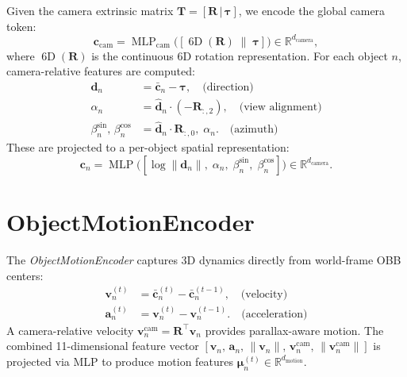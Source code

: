 \documentclass{article}
\newcommand{\mR}{\mathbb{R}}
\newcommand{\op}[1]{\operatorname{#1}}
\newcommand{\mat}[1]{\bm{#1}}
\begin{document}
Given the camera extrinsic matrix $\mat{T} = [\mat{R}\,|\,\boldsymbol{\tau}]$, we encode the global camera token:
\begin{equation}
    \mat{c}_{\text{cam}} = \op{MLP}_{\text{cam}}\bigl([\op{6D}(\mat{R}) \;\|\; \boldsymbol{\tau}]\bigr) \in \mR^{d_{\text{camera}}},
    \label{eq:cam_global}
\end{equation}
where $\op{6D}(\mat{R})$ is the continuous 6D rotation representation. For each object $n$, camera-relative features are computed:
\begin{align}
    \mat{d}_n &= \bar{\mat{c}}_n - \boldsymbol{\tau}, \quad \text{(direction)} \label{eq:cam_dir} \\
    \alpha_n &= \hat{\mat{d}}_n \cdot (-\mat{R}_{:,2}), \quad \text{(view alignment)} \label{eq:view_align} \\
    \beta_n^{\sin},\,\beta_n^{\cos} &= \hat{\mat{d}}_n \cdot \mat{R}_{:,0},\; \alpha_n. \quad \text{(azimuth)} \label{eq:azimuth}
\end{align}
These are projected to a per-object spatial representation:
\begin{equation}
    \mat{c}_n = \op{MLP}\bigl([\log\|\mat{d}_n\|,\;\alpha_n,\;\beta_n^{\sin},\;\beta_n^{\cos}]\bigr) \in \mR^{d_{\text{camera}}}.
    \label{eq:cam_per_obj}
\end{equation}

\section{ObjectMotionEncoder}
\label{sec:ome}

The \emph{ObjectMotionEncoder} captures 3D dynamics directly from world-frame OBB centers:
\begin{align}
    \mat{v}_n^{(t)} &= \bar{\mat{c}}_n^{(t)} - \bar{\mat{c}}_n^{(t-1)}, \quad \text{(velocity)} \label{eq:velocity} \\
    \mat{a}_n^{(t)} &= \mat{v}_n^{(t)} - \mat{v}_n^{(t-1)}. \quad \text{(acceleration)} \label{eq:accel}
\end{align}
A camera-relative velocity $\mat{v}_n^{\text{cam}} = \mat{R}^{\!\top}\mat{v}_n$ provides parallax-aware motion. The combined 11-dimensional feature vector $[\mat{v}_n,\,\mat{a}_n,\,\|\mat{v}_n\|,\,\mat{v}_n^{\text{cam}},\,\|\mat{v}_n^{\text{cam}}\|]$ is projected via MLP to produce motion features $\mat{\mu}_n^{(t)} \in \mR^{d_{\text{motion}}}$.
\end{document}
